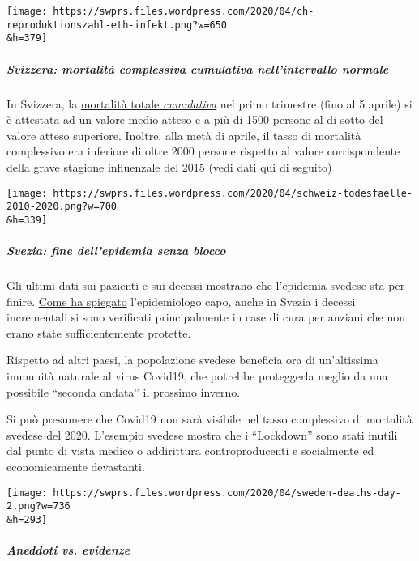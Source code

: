 \texttt{[image: https://swprs.files.wordpress.com/2020/04/ch-reproduktionszahl-eth-infekt.png?w=650\\\&h=379]}

\hypertarget{svizzera-mortalituxe0-complessiva-cumulativa-nellintervallo-normale}{%
\subparagraph{\texorpdfstring{\textbf{Svizzera: mortalità complessiva
cumulativa nell'intervallo
normale}}{Svizzera: mortalità complessiva cumulativa nell'intervallo normale}}\label{svizzera-mortalituxe0-complessiva-cumulativa-nellintervallo-normale}}

In Svizzera, la
\href{https://swprs.files.wordpress.com/2020/04/ch-sterblichkeit-kumuliert-q1-2020.pdf}{mortalità
totale \emph{cumulativa}} nel primo trimestre (fino al 5 aprile) si è
attestata ad un valore medio atteso e a più di 1500 persone al di sotto
del valore atteso superiore. Inoltre, alla metà di aprile, il tasso di
mortalità complessivo era inferiore di oltre 2000 persone rispetto al
valore corrispondente della grave stagione influenzale del 2015 (vedi
dati qui di seguito)

\texttt{[image: https://swprs.files.wordpress.com/2020/04/schweiz-todesfaelle-2010-2020.png?w=700\\\&h=339]}

\hypertarget{svezia-fine-dellepidemia-senza-blocco}{%
\subparagraph{\texorpdfstring{\textbf{Svezia: fine dell'epidemia senza
blocco}}{Svezia: fine dell'epidemia senza blocco}}\label{svezia-fine-dellepidemia-senza-blocco}}

Gli ultimi dati sui pazienti e sui decessi mostrano che l'epidemia
svedese sta per finire.
\href{https://www.washingtontimes.com/news/2020/apr/15/sweden-coronavirus-rates-easing-despite-loose-rule/}{Come
ha spiegato} l'epidemiologo capo, anche in Svezia i decessi incrementali
si sono verificati principalmente in case di cura per anziani che non
erano state sufficientemente protette.

Rispetto ad altri paesi, la popolazione svedese beneficia ora di
un'altissima immunità naturale al virus Covid19, che potrebbe
proteggerla meglio da una possibile ``seconda ondata'' il prossimo
inverno.

Si può presumere che Covid19 non sarà visibile nel tasso complessivo di
mortalità svedese del 2020. L'esempio svedese mostra che i ``Lockdown''
sono stati inutili dal punto di vista medico o addirittura
controproducenti e socialmente ed economicamente devastanti.

\texttt{[image: https://swprs.files.wordpress.com/2020/04/sweden-deaths-day-2.png?w=736\\\&h=293]}

\hypertarget{aneddoti-vs-evidenze}{%
\subparagraph{\texorpdfstring{\textbf{Aneddoti vs.
evidenze}}{Aneddoti vs. evidenze}}\label{aneddoti-vs-evidenze}}

